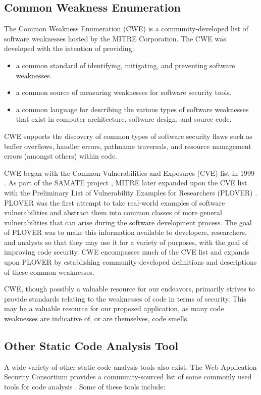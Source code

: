 \documentclass{sig-alternate}
\begin{document}
\subsection{Common Weakness Enumeration}
The Common Weakness Enumeration (CWE) \cite{mitre2006cwe} is a community-developed list of software weaknesses hosted by the MITRE Corporation. The CWE was developed with the intention of providing:

\begin{itemize}
\item a common standard of identifying, mitigating, and preventing software weaknesses.
\item a common source of measuring weaknesses for software security tools.
\item a common language for describing the various types of software weaknesses that exist in computer architecture, software design, and source code.
\end{itemize}

CWE supports the discovery of common types of software security flaws such as buffer overflows, handler errors, pathname traversals, and resource management errors (amongst others) within code.

CWE began with the Common Vulnerabilities and Exposures (CVE) list in 1999 \cite{mitre2005cve}. As part of the SAMATE project \cite{nist2005samate}, MITRE later expanded upon the CVE list with the Preliminary List of Vulnerability Examples for Researchers (PLOVER) \cite{christey2005plover}. PLOVER was the first attempt to take real-world examples of software vulnerabilities and abstract them into common classes of more general vulnerabilities that can arise during the software development process. The goal of PLOVER was to make this information available to developers, researchers, and analysts so that they may use it for a variety of purposes, with the goal of improving code security. CWE encompasses much of the CVE list and expands upon PLOVER by establishing community-developed definitions and descriptions of these common weaknesses.

CWE, though possibly a valuable resource for our endeavors, primarily strives to provide standards relating to the weaknesses of code in terms of security. This may be a valuable resource for our proposed application, as many code weaknesses are indicative of, or are themselves, code smells.

\subsection{Other Static Code Analysis Tool}
A wide variety of other static code analysis tools also exist. The Web Application Security Consortium provides a community-sourced list of some commonly used tools for code analysis \cite{webappsec2012}. Some of these tools include:
\end{document}
